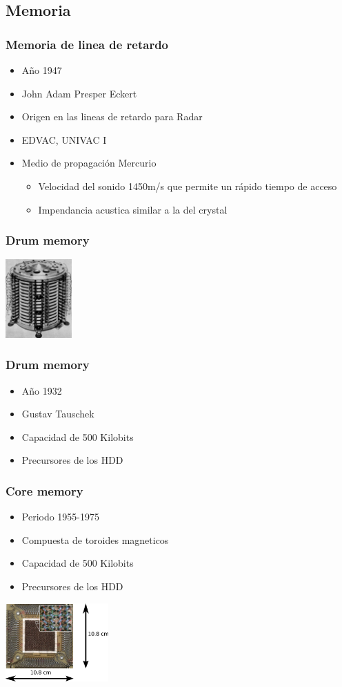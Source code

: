 \documentclass{beamer}
\begin{document}
\subsection{Memoria}
\begin{frame}
\frametitle{Memoria de linea de retardo}
\begin{itemize}
	\item Año 1947
	\item John Adam Presper Eckert
	\item Origen en las lineas de retardo para Radar
	\item EDVAC, UNIVAC I
	\item Medio de propagación Mercurio
		\begin{itemize}
			\item Velocidad del sonido 1450m/s que permite un rápido tiempo de acceso
			\item Impendancia acustica similar a la del crystal 
		\end{itemize}
\end{itemize}
\end{frame}

\begin{frame}
\frametitle{Drum memory}
\includegraphics[height=3cm]{Pamiec_bebnowa_1.jpg}
\end{frame}

\begin{frame}
\frametitle{Drum memory}
\begin{itemize}
	\item Año 1932
	\item Gustav Tauschek
	\item Capacidad de 500 Kilobits
	\item Precursores de los HDD
\end{itemize}
\end{frame}

\begin{frame}
\frametitle{Core memory}
\begin{itemize}
	\item Periodo 1955-1975
	\item Compuesta de toroides magneticos
	\item Capacidad de 500 Kilobits
	\item Precursores de los HDD
\end{itemize}
\includegraphics[height=3cm]{Ferrite_core_memory.eps}
\end{frame}
\end{document}
